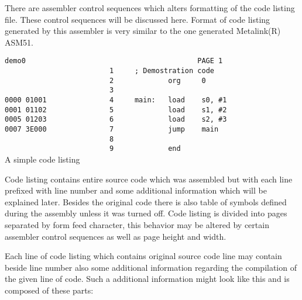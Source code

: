     There are assembler control sequences which alters formatting of the code listing file. These control sequences will be discussed here. Format of code listing generated by this assembler is very similar to the one generated Metalink(R) ASM51.

    \begin{code}[h]
        \mysmallfont{}
        \verb'demo0                                         PAGE 1'\\
        \verb'                         1     ; Demostration code'\\
        \verb'                         2             org     0'\\
        \verb'                         3'\\
        \verb'0000 01001               4     main:   load    s0, #1'\\
        \verb'0001 01102               5             load    s1, #2'\\
        \verb'0005 01203               6             load    s2, #3'\\
        \verb'0007 3E000               7             jump    main'\\
        \verb'                         8'\\
        \verb'                         9             end'\\
        \caption{A simple code listing}
    \end{code}

    Code listing contains entire source code which was assembled but with each line prefixed with line number and some additional information which will be explained later. Besides the original code there is also table of symbols defined during the assembly unless it was turned off. Code listing is divided into pages separated by form feed character, this behavior may be altered by certain assembler control sequences as well as page height and width.

    Each line of code listing which contains original source code line may contain beside line number also some additional information regarding the compilation of the given line of code. Such a additional information might look like this and is composed of these parts:

